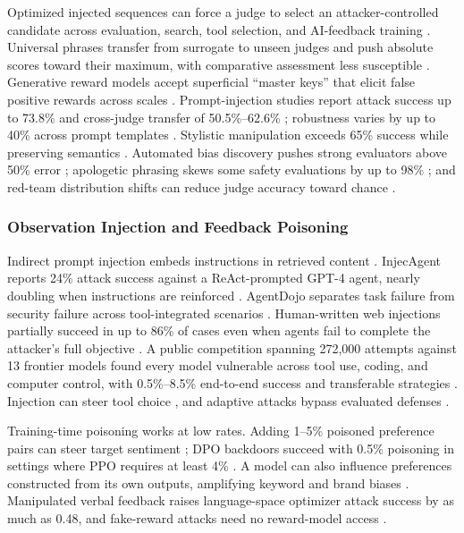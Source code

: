 Optimized injected sequences can force a judge to select an attacker-controlled candidate across evaluation, search, tool selection, and AI-feedback training \citep{shi2024optimization}. Universal phrases transfer from surrogate to unseen judges and push absolute scores toward their maximum, with comparative assessment less susceptible \citep{raina2024is}. Generative reward models accept superficial ``master keys'' that elicit false positive rewards across scales \citep{zhao2025one}. Prompt-injection studies report attack success up to 73.8\% and cross-judge transfer of 50.5\%--62.6\% \citep{maloyan2025adversarial}; robustness varies by up to 40\% across prompt templates \citep{li2025llms}. Stylistic manipulation exceeds 65\% success while preserving semantics \citep{yang2026turning}. Automated bias discovery pushes strong evaluators above 50\% error \citep{lai2026biasscope}; apologetic phrasing skews some safety evaluations by up to 98\% \citep{chen2025safer}; and red-team distribution shifts can reduce judge accuracy toward chance \citep{schwinn2026coin}.

\subsubsection{Observation Injection and Feedback Poisoning}
\label{supp:safety-injection-poisoning}

Indirect prompt injection embeds instructions in retrieved content \citep{greshake2023not}. InjecAgent reports 24\% attack success against a ReAct-prompted GPT-4 agent, nearly doubling when instructions are reinforced \citep{zhan2024injecagent}. AgentDojo separates task failure from security failure across tool-integrated scenarios \citep{debenedetti2024agentdojo}. Human-written web injections partially succeed in up to 86\% of cases even when agents fail to complete the attacker's full objective \citep{evtimov2025wasp}. A public competition spanning 272,000 attempts against 13 frontier models found every model vulnerable across tool use, coding, and computer control, with 0.5\%--8.5\% end-to-end success and transferable strategies \citep{dziemian2026how}. Injection can steer tool choice \citep{shi2025prompt}, and adaptive attacks bypass evaluated defenses \citep{zhan2025adaptive}.

Training-time poisoning works at low rates. Adding 1--5\% poisoned preference pairs can steer target sentiment \citep{baumgartner2024best}; DPO backdoors succeed with 0.5\% poisoning in settings where PPO requires at least 4\% \citep{pathmanathan2024is}. A model can also influence preferences constructed from its own outputs, amplifying keyword and brand biases \citep{hahm2026alignment}. Manipulated verbal feedback raises language-space optimizer attack success by as much as 0.48, and fake-reward attacks need no reward-model access \citep{zhao2025are}.

